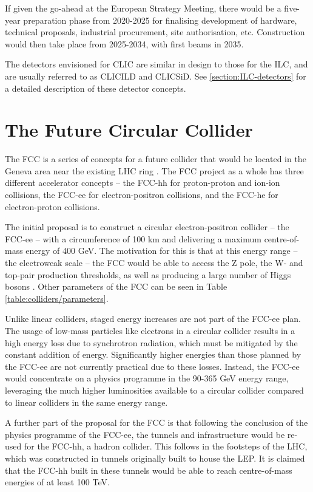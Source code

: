 If given the go-ahead at the European Strategy Meeting, there would be a five-year preparation phase from 2020-2025 for finalising development of hardware, technical proposals, industrial procurement, site authorisation, etc. Construction would then take place from 2025-2034, with first beams in 2035.

The detectors envisioned for \acrshort{CLIC} are similar in design to those for the \acrshort{ILC}, and are usually referred to as CLIC\textunderscore ILD and CLIC\textunderscore SiD. See \ref{section:ILC-detectors} for a detailed description of these detector concepts.

\section{The Future Circular Collider}
The \acrfull{FCC} is a series of concepts for a future collider that would be located in the Geneva area near the existing LHC ring \cite{fcc-cdr-engineering}. The \acrshort{FCC} project as a whole has three different accelerator concepts -- the FCC-hh for proton-proton and ion-ion collisions, the FCC-ee for electron-positron collisions, and the FCC-he for electron-proton collisions.

The initial proposal is to construct a circular electron-positron collider -- the FCC-ee -- with a circumference of 100 km and delivering a maximum centre-of-mass energy of 400 GeV. The motivation for this is that at this energy range -- the electroweak scale -- the \acrshort{FCC} would be able to access the Z pole, the W- and top-pair production thresholds, as well as producing a large number of Higgs bosons \cite{fcc-cdr-physics}. Other parameters of the \acrshort{FCC} can be seen in Table \ref{table:colliders/parameters}.

Unlike linear colliders, staged energy increases are not part of the FCC-ee plan. The usage of low-mass particles like electrons in a circular collider results in a high energy loss due to synchrotron radiation, which must be mitigated by the constant addition of energy. Significantly higher energies than those planned by the FCC-ee are not currently practical due to these losses. Instead, the FCC-ee would concentrate on a physics programme in the 90-365 GeV energy range, leveraging the much higher luminosities available to a circular collider compared to linear colliders in the same energy range.

A further part of the proposal for the \acrshort{FCC} is that following the conclusion of the physics programme of the FCC-ee, the tunnels and infrastructure would be re-used for the FCC-hh, a hadron collider. This follows in the footsteps of the \acrshort{LHC}, which was constructed in tunnels originally built to house the \acrfull{LEP}. It is claimed that the FCC-hh built in these tunnels would be able to reach centre-of-mass energies of at least 100 TeV.

